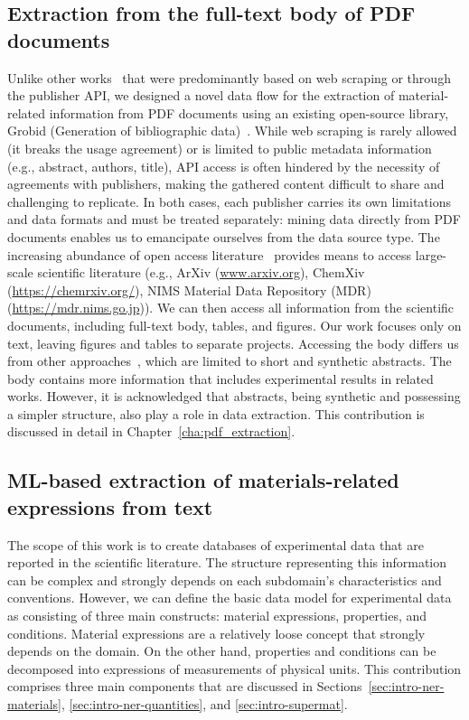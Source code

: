 \subsection{Extraction from the full-text body of PDF documents}
\label{sec:intro-pdf-contribution}

Unlike other works~\cite{court2018auto, court2020magnetic, kononova2019text} that were predominantly based on web scraping or through the publisher API, we designed a novel data flow for the extraction of material-related information from PDF documents using an existing open-source library, Grobid (Generation of bibliographic data)~\cite{Grobid}. 
While web scraping is rarely allowed (it breaks the usage agreement) or is limited to public metadata information (e.g., abstract, authors, title), API access is often hindered by the necessity of agreements with publishers, making the gathered content difficult to share and challenging to replicate.
In both cases, each publisher carries its own limitations and data formats and must be treated separately: mining data directly from PDF documents enables us to emancipate ourselves from the data source type.
The increasing abundance of open access literature~\cite{laakso2011the} provides means to access large-scale scientific literature (e.g., ArXiv (\url{www.arxiv.org}), ChemXiv (\url{https://chemrxiv.org/}), NIMS Material Data Repository (MDR)~\cite{tanifuji2019mdr} (\url{https://mdr.nims.go.jp})). 
We can then access all information from the scientific documents, including full-text body, tables, and figures. Our work focuses only on text, leaving figures and tables to separate projects. 
Accessing the body differs us from other approaches~\cite{yamaguchi-etal-2020-sc}, which are limited to short and synthetic abstracts. The body contains more information that includes experimental results in related works. 
However, it is acknowledged that abstracts, being synthetic and possessing a simpler structure, also play a role in data extraction.
This contribution is discussed in detail in Chapter~\ref{cha:pdf_extraction}.

\subsection{ML-based extraction of materials-related expressions from text}
\label{sec:intro-material-related-extraction}

The scope of this work is to create databases of experimental data that are reported in the scientific literature. 
The structure representing this information can be complex and strongly depends on each subdomain's characteristics and conventions. 
However, we can define the basic data model for experimental data as consisting of three main constructs: material expressions, properties, and conditions. 
Material expressions are a relatively loose concept that strongly depends on the domain. On the other hand, properties and conditions can be decomposed into expressions of measurements of physical units. 
This contribution comprises three main components that are discussed in Sections~\ref{sec:intro-ner-materials}, \ref{sec:intro-ner-quantities}, and \ref{sec:intro-supermat}.

